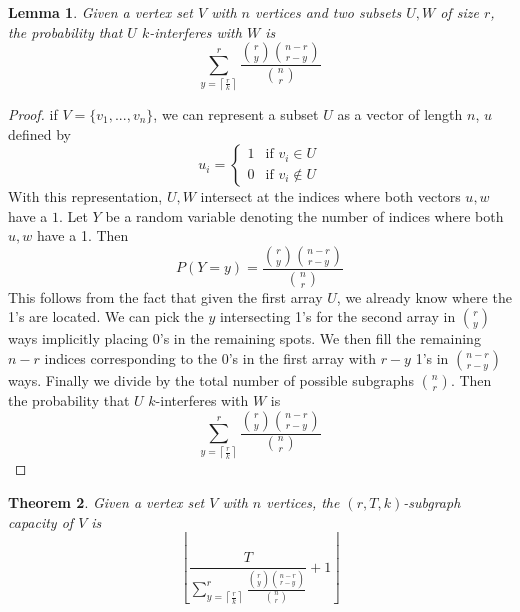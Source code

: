 \documentclass[10pt]{extarticle}
\newtheorem{theorem}{Theorem}
\newtheorem{lemma}[theorem]{Lemma}
\theoremstyle{definition}
\begin{document}
\begin{lemma}
    Given a vertex set $V$ with $n$ vertices and two subsets $U,W$ of size $r$, the probability that $U$ $k$-interferes with $W$ is 
    \begin{equation*}
        \sum_{y = \left\lceil \frac{r}{k} \right\rceil}^{r}  \frac{\binom{r}{y} \binom{n-r}{r-y}}{\binom{n}{r}}
    \end{equation*}
\end{lemma}
\begin{proof}
    if $V = \{v_1,...,v_n\}$, we can represent a subset $U$ as a vector of length $n$, $u$ defined by
    $$
    u_i = \begin{cases}
        1 & \text{if } v_i \in U \\
        0 & \text{if } v_i \notin U
    \end{cases}
    $$
    With this representation, $U,W$ intersect at the indices where both vectors $u, w$ have a $1$. Let $Y$ be a random variable denoting the number of indices where both $u, w$ have a 1. Then 
    \begin{equation}
        P(Y=y) = \frac{\binom{r}{y} \binom{n-r}{r-y}}{\binom{n}{r}}
    \end{equation}
    This follows from the fact that given the first array $U$, we already know where the 1's are located. We can pick the $y$ intersecting 1's for the second array in $\binom{r}{y}$ ways implicitly placing 0's in the remaining spots. We then fill the remaining $n-r$ indices corresponding to the 0's in the first array with $r-y$ 1's in $\binom{n-r}{r-y}$ ways. Finally we divide by the total number of possible subgraphs $\binom{n}{r}$. 
    Then the probability that $U$ $k$-interferes with $W$ is 
    \begin{equation}
        \sum_{y = \left\lceil \frac{r}{k} \right\rceil}^{r}  \frac{\binom{r}{y} \binom{n-r}{r-y}}{\binom{n}{r}}
    \end{equation}
\end{proof}


\begin{theorem}
    Given a vertex set $V$ with $n$ vertices, the $(r,T,k)$-subgraph capacity of $V$ is 
    \begin{equation*}
        \left\lfloor \frac{T}{\sum_{y = \left\lceil \frac{r}{k} \right\rceil}^{r}  \frac{\binom{r}{y} \binom{n-r}{r-y}}{\binom{n}{r}}} + 1 \right\rfloor
    \end{equation*}
\end{theorem}
\end{document}
